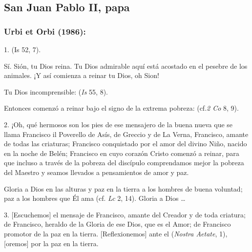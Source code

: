 			
\newsection

					
		\subsection{San Juan Pablo II, papa}
				
			\subsubsection{Urbi et Orbi (1986):}
					
						
				\begin{body}
					1.  (Is 52, 7).
							
					Sí. Sión, tu Dios reina. Tu Dios admirable aquí está acostado en el pesebre de los animales. ¡Y así comienza a reinar tu Dios, oh Sion!
							
					Tu Dios incomprensible:  (\emph{Is} 55, 8).
							
					Entonces comenzó a reinar bajo el signo de la extrema pobreza:  (cf.\emph{2 Co} 8, 9).
					
					2. ¡Oh, qué hermosos son los pies de ese mensajero de la buena nueva que se llama Francisco il Poverello de Asís, de Greccio y de La Verna, Francisco, amante de todas las criaturas; Francisco conquistado por el amor del divino Niño, nacido en la noche de Belén; Francisco en cuyo corazón Cristo comenzó a reinar, para que incluso a través de la pobreza del discípulo comprendamos mejor la pobreza del Maestro y seamos llevados a pensamientos de amor y paz.
					
					Gloria a Dios en las alturas y paz en la tierra a los hombres de buena voluntad; paz a los hombres que Él ama (cf. \emph{Lc} 2, 14). Gloria a Dios \ldots{}
					
					3. {[}Escuchemos{]} el mensaje de Francisco, amante del Creador y de toda criatura; de Francisco, heraldo de la Gloria de ese Dios, que  es el Amor; de Francisco promotor de la paz en la tierra. {[}Reflexionemos{]} ante el  ({\emph{Nostra Aetate}}, 1), {[}oremos{]} por la paz en la tierra.
					

\end{body}
